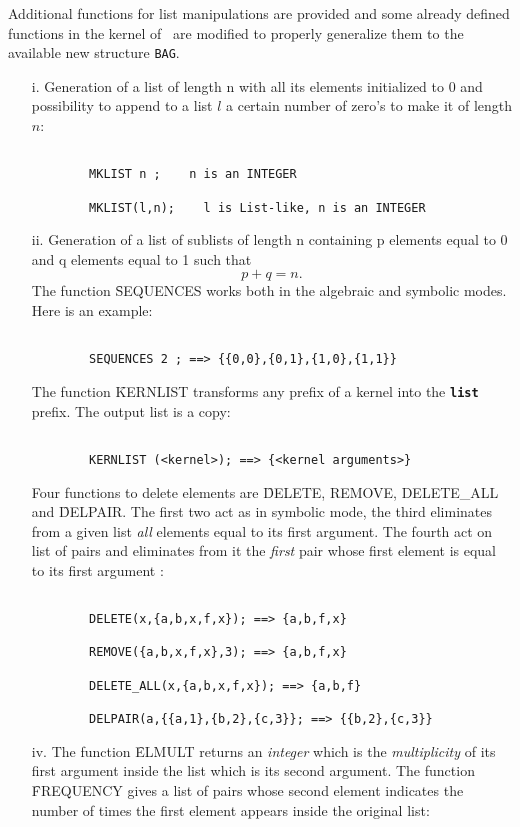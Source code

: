 Additional functions for list manipulations are provided and some already
defined functions in the kernel of \REDUCE\ are modified to properly
generalize them to the available new structure {\tt BAG}.
\begin{itemize}
\item[i.]
Generation of a list of length n with all its elements initialized to 0
and possibility to append to a list $l$ a certain number of zero's to
make it of length $n$:
\begin{verbatim}

        MKLIST n ;    n is an INTEGER

        MKLIST(l,n);    l is List-like, n is an INTEGER

\end{verbatim}

\item[ii.]
Generation of a list of sublists of length n containing p elements
equal to 0 and q elements equal to 1 such that  $$p+q=n .$$
The function \f{SEQUENCES} works both in the algebraic and
symbolic modes.  Here is an example:
\begin{verbatim}

        SEQUENCES 2 ; ==> {{0,0},{0,1},{1,0},{1,1}}

\end{verbatim}
The function \f{KERNLIST} transforms any prefix of a kernel into the
{\bf \verb+list+} prefix. The output list is a copy:
\begin{verbatim}

        KERNLIST (<kernel>); ==> {<kernel arguments>}

\end{verbatim}
Four functions to delete elements are \f{DELETE, REMOVE, DELETE\_ALL} and
\f{DELPAIR}. The first two act as in symbolic mode, the third
eliminates from a given list {\em all}
elements equal to its first argument. The fourth act on list of pairs
and eliminates from it the {\em first} pair whose first element is equal to
its first argument :
\begin{verbatim}

        DELETE(x,{a,b,x,f,x}); ==> {a,b,f,x}

        REMOVE({a,b,x,f,x},3); ==> {a,b,f,x}

        DELETE_ALL(x,{a,b,x,f,x}); ==> {a,b,f}

        DELPAIR(a,{{a,1},{b,2},{c,3}}; ==> {{b,2},{c,3}}

\end{verbatim}
\item[iv.]
The function \f{ELMULT} returns an {\em integer} which is the
{\em multiplicity} of its first argument inside the list which is its
second argument.
The function \f{FREQUENCY} gives a list of pairs
whose second element indicates the number of times the first element
appears inside the original list:
\begin{verbatim}


\end{verbatim}
\end{itemize}
